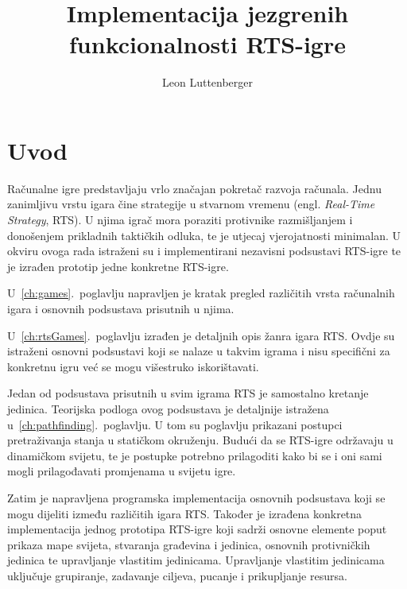 \documentclass[times, utf8, zavrsni, numeric]{fer}
\begin{document}

\title{Implementacija jezgrenih funkcionalnosti RTS-igre}

\author{Leon Luttenberger}

\maketitle



\zahvala{}

\tableofcontents

\chapter{Uvod}

\par Računalne igre predstavljaju vrlo značajan pokretač razvoja računala.
Jednu zanimljivu vrstu igara čine strategije u stvarnom vremenu (engl. \textit{Real-Time Strategy}, RTS).
U njima igrač mora poraziti protivnike razmišljanjem i donošenjem prikladnih taktičkih odluka, te je utjecaj vjerojatnosti minimalan.
U okviru ovoga rada istraženi su i implementirani nezavisni podsustavi RTS-igre te je izrađen prototip jedne konkretne RTS-igre.

\par U~\ref{ch:games}.~poglavlju napravljen je kratak pregled različitih vrsta računalnih igara i osnovnih podsustava prisutnih u njima.

\par U~\ref{ch:rtsGames}.~poglavlju izrađen je detaljnih opis žanra igara RTS.
Ovdje su istraženi osnovni podsustavi koji se nalaze u takvim igrama i nisu specifični za konkretnu igru već se mogu višestruko iskorištavati.

\par Jedan od podsustava prisutnih u svim igrama RTS je samostalno kretanje jedinica. 
Teorijska podloga ovog podsustava je detaljnije istražena u~\ref{ch:pathfinding}.~poglavlju.
U tom su poglavlju prikazani postupci pretraživanja stanja u statičkom okruženju.
Budući da se RTS-igre održavaju u dinamičkom svijetu, te je postupke potrebno prilagoditi kako bi se i oni sami mogli prilagođavati promjenama u svijetu igre.

\par Zatim je napravljena programska implementacija osnovnih podsustava koji se mogu dijeliti između različitih igara RTS.
Također je izrađena konkretna implementacija jednog prototipa RTS-igre koji sadrži osnovne elemente poput prikaza mape svijeta, stvaranja građevina i jedinica, osnovnih protivničkih jedinica te upravljanje vlastitim jedinicama.
Upravljanje vlastitim jedinicama uključuje grupiranje, zadavanje ciljeva, pucanje i prikupljanje resursa.
\end{document}
